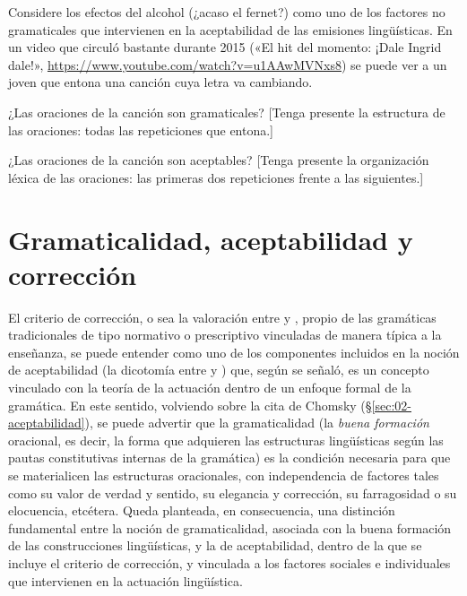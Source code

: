 \begin{ejercicio}\label{ej:02-ingrid}
Considere los efectos del alcohol (¿acaso el fernet?) como uno de los factores
no gramaticales que intervienen en la aceptabilidad de las emisiones
lingüísticas. En un video que circuló bastante durante 2015 («El hit del
momento: ¡Dale Ingrid dale!»,
\url{https://www.youtube.com/watch?v=u1AAwMVNxs8}) se puede ver a un joven que
entona una canción cuya letra va cambiando.

\begin{consignas}
  \item ¿Las oraciones de la canción son gramaticales? [Tenga presente la
        estructura de las oraciones: todas las repeticiones que entona.]
  \item ¿Las oraciones de la canción son aceptables? [Tenga presente la
        organización léxica de las oraciones: las primeras dos repeticiones
        frente a las siguientes.]
\end{consignas}
\end{ejercicio}

\section{Gramaticalidad, aceptabilidad y corrección}

El criterio de corrección, o sea la valoración entre 
y , propio de las gramáticas tradicionales de tipo
normativo o prescriptivo vinculadas de manera típica a la enseñanza, se puede
entender como uno de los componentes incluidos en la noción de aceptabilidad (la
dicotomía entre  y ) que, según se señaló, es un concepto vinculado con la teoría de la
actuación dentro de un enfoque formal de la gramática. En este sentido,
volviendo sobre la cita de Chomsky (§\ref{sec:02-aceptabilidad}), se puede advertir que la
gramaticalidad (la \textit{buena formación} oracional, es decir, la forma que
adquieren las estructuras lingüísticas según las pautas constitutivas internas
de la gramática) es la condición necesaria para que se materialicen las
estructuras oracionales, con independencia de factores tales como su valor de
verdad y sentido, su elegancia y corrección, su farragosidad o su elocuencia,
etcétera. Queda planteada, en consecuencia, una distinción fundamental entre la
noción de gramaticalidad, asociada con la buena formación de las construcciones
lingüísticas, y la de aceptabilidad, dentro de la que se incluye el criterio de
corrección, y vinculada a los factores sociales e individuales que intervienen
en la actuación lingüística.

